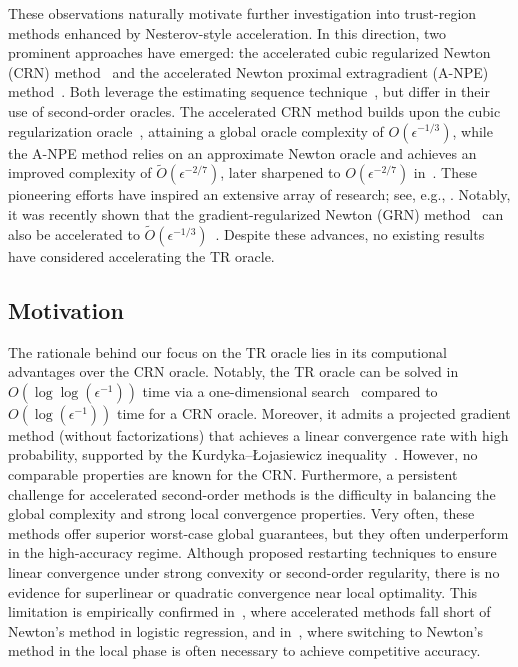 \documentclass{mcom-l}
\numberwithin{equation}{section}
\begin{document}
These observations naturally motivate further investigation into trust-region methods enhanced by Nesterov-style acceleration. In this direction, two prominent approaches have emerged: the accelerated cubic regularized Newton (CRN) method~\cite{nesterov2008accelerating} and the accelerated Newton proximal extragradient (A-NPE) method~\cite{monteiro2013accelerated}. Both leverage the estimating sequence technique~\cite{nesterovMethodSolvingConvex1983a,baesEstimateSequenceMethods2009a}, but differ in their use of second-order oracles. The accelerated CRN method builds upon the cubic regularization oracle~\cite{nesterov2006cubic}, attaining a global oracle complexity of $O(\epsilon^{-1/3})$, while the A-NPE method relies on an approximate Newton oracle and achieves an improved complexity of $\tilde{O}(\epsilon^{-2/7})$, later sharpened to $O(\epsilon^{-2/7})$ in~\cite{carmon2022optimal,NEURIPS2022_e56f394b}. These pioneering efforts have inspired an extensive array of research; see, e.g., \cite{jiang2021optimal,chen2022accelerating,lin2022explicit,agafonov2023inexact,agafonov2024advancing,jiang2024accelerated,huang2024inexact}. Notably, it was recently shown that the gradient-regularized Newton (GRN) method~\cite{mishchenko_regularized_2023} can also be accelerated to $\tilde{O}(\epsilon^{-1/3})$~\cite{doikov2020contracting}.
Despite these advances, no existing results have considered accelerating the TR oracle.

\subsection{Motivation}
The rationale behind our focus on the TR oracle lies in its computional advantages over the CRN oracle. Notably, the TR oracle can be solved in $O(\log\log(\epsilon^{-1}))$ time via a one-dimensional search~\cite{yenewcomplexityresult1991,vavasisProvingPolynomialtimeSphereconstrained1990} compared to $O(\log(\epsilon^{-1}))$ time for a CRN oracle. Moreover, it admits a projected gradient method (without factorizations) that achieves a linear convergence rate with high probability, supported by the Kurdyka–Łojasiewicz inequality~\cite{jiangHolderianErrorBounds2022}. However, no comparable properties are known for the CRN.
Furthermore, a persistent challenge for accelerated second-order methods is the difficulty in balancing the global complexity and strong local convergence properties. Very often, these methods offer superior worst-case global guarantees, but they often underperform in the high-accuracy regime. Although \citet[Sections 4.2.5–4.2.6]{nesterov_lectures_2018} proposed restarting techniques to ensure linear convergence under strong convexity or second-order regularity, there is no evidence for superlinear or quadratic convergence near local optimality. This limitation is empirically confirmed in~\cite{carmon2022optimal}, where accelerated methods fall short of Newton’s method in logistic regression, and in~\cite{jiang2020unified,huang2024inexact}, where switching to Newton’s method in the local phase is often necessary to achieve competitive accuracy.
\end{document}
